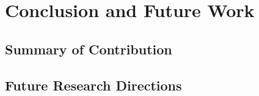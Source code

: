 
\chapter{Conclusion and Future Work}\label{chapter:conclusion}

\section{Summary of Contribution}

\section{Future Research Directions}
